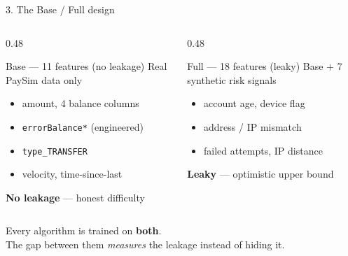 \documentclass[aspectratio=169]{beamer}
\newcommand{\good}[1]{\textcolor{good}{\textbf{#1}}}
\newcommand{\warn}[1]{\textcolor{hustdark}{\textbf{#1}}}
\begin{document}
\begin{frame}{3. The Base / Full design}
\begin{columns}[T]
\begin{column}{0.48\textwidth}
\begin{block}{Base --- 11 features (no leakage)}
Real PaySim data only
\begin{itemize}
    \item amount, 4 balance columns
    \item \texttt{errorBalance*} (engineered)
    \item \texttt{type\_TRANSFER}
    \item velocity, time-since-last
\end{itemize}
\good{No leakage} --- honest difficulty
\end{block}
\end{column}
\begin{column}{0.48\textwidth}
\begin{block}{Full --- 18 features (leaky)}
Base $+$ 7 synthetic risk signals
\begin{itemize}
    \item account age, device flag
    \item address / IP mismatch
    \item failed attempts, IP distance
\end{itemize}
\warn{Leaky} --- optimistic upper bound
\end{block}
\end{column}
\end{columns}

\vspace{1em}
\centering
Every algorithm is trained on \textbf{both}.\\
\alert{The gap between them \emph{measures} the leakage instead of hiding it.}
\end{frame}
\end{document}
